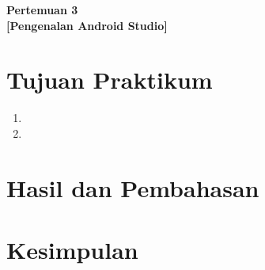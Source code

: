 \documentclass[a4paper,oneside,11pt]{book}
\newcommand{\Pertemuan}{3} %
\newcommand{\Materi}{Pengenalan Android Studio} %
\begin{document}
\renewcommand{\cfttoctitlefont}{\hfill\normalfont\LARGE\bfseries}
\renewcommand{\cftaftertoctitle}{\hfill}
\renewcommand{\cftbeforetoctitleskip}{1em}
\renewcommand{\cftaftertoctitleskip}{1.5em}

\renewcommand{\cftchappresnum}{Bab~}
\renewcommand{\cftchapaftersnum}{.}
\renewcommand{\cftchapnumwidth}{3.5em}
\renewcommand{\cftchapfont}{\bfseries}
\renewcommand{\cftchappagefont}{\bfseries}

\setlength{\cftbeforechapskip}{0.8em} %
\setlength{\cftbeforesecskip}{0.2em}  %
\renewcommand{\cftsecfont}{\normalfont}
\renewcommand{\cftsubsecfont}{\normalfont}

\renewcommand{\contentsname}{\centering Daftar Isi}
\renewcommand{\listfigurename}{\centering Daftar Gambar}
\renewcommand{\lstlistlistingname}{\centering Daftar Kode}

\renewcommand{\cftloftitlefont}{\hfill\normalfont\LARGE\bfseries}
\renewcommand{\cftafterloftitle}{\hfill}

\tableofcontents

\newpage
\listoffigures

\newpage
\lstlistoflistings

\newpage
\begin{center}
\textbf{\LARGE Pertemuan \Pertemuan\\
{[{\Materi}]}}
\end{center}

\section{Tujuan Praktikum}
\begin{enumerate}
    \item 
    \item 
\end{enumerate}



\section{Hasil dan Pembahasan}

\section{Kesimpulan}
\end{document}
